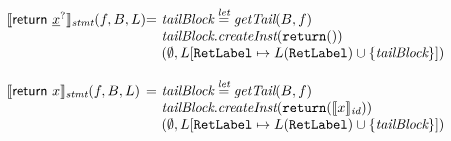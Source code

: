 \[\begin{array}{l@{}l@{~}l}
\transfun{\irreturn{}}_{\emph{stmt}}(f, B, L)
& = & \emph{tailBlock} \letval \getTail(B, f)\\
& & \emph{tailBlock}.\emph{createInst}(\TT{return}())\\
& & (\emptyset, L[\RetLabel \mapsto L(\RetLabel) \cup \{ \emph{tailBlock}\}])\\
& & \\

\transfun{\ircfgreturn{x}}_{\emph{stmt}}(f, B, L)
& = & \emph{tailBlock} \letval \getTail(B, f)\\
& & \emph{tailBlock}.\emph{createInst}(\TT{return}(\transfun{x}_{\emph{id}}))\\
& & (\emptyset, L[\RetLabel \mapsto L(\RetLabel) \cup \{ \emph{tailBlock}\}])\\
\end{array}
\]

